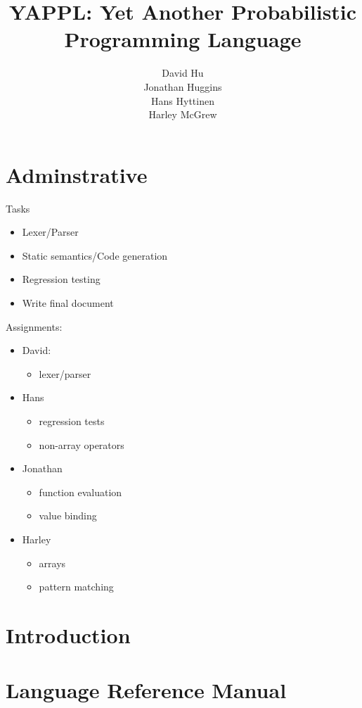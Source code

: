 \documentclass[11pt]{article}
\begin{document}
\setcounter{secnumdepth}{5}


\title{YAPPL: Yet Another Probabilistic Programming Language}
\author{  David Hu \\ Jonathan Huggins \\ Hans Hyttinen  \\ Harley McGrew}

\maketitle

\fancyhead{}
\fancyhead[L]{}
\fancyhead[R]{}

\newpage

\tableofcontents

\newpage

\section{ Adminstrative}

Tasks
\begin{itemize}
\item Lexer/Parser
\item Static semantics/Code generation
\item Regression testing
\item Write final document
\end{itemize}

Assignments:
\begin{itemize}
\item David:
\begin{itemize}
\item lexer/parser
\end{itemize}
\item Hans
\begin{itemize}
\item regression tests
\item non-array operators
\end{itemize}
\item Jonathan
\begin{itemize}
\item function evaluation
\item value binding
\end{itemize}
\item Harley
\begin{itemize}
\item arrays
\item pattern matching
\end{itemize}
\end{itemize}

\section{Introduction}



\newpage

\section{Language Reference Manual}


\end{document}
